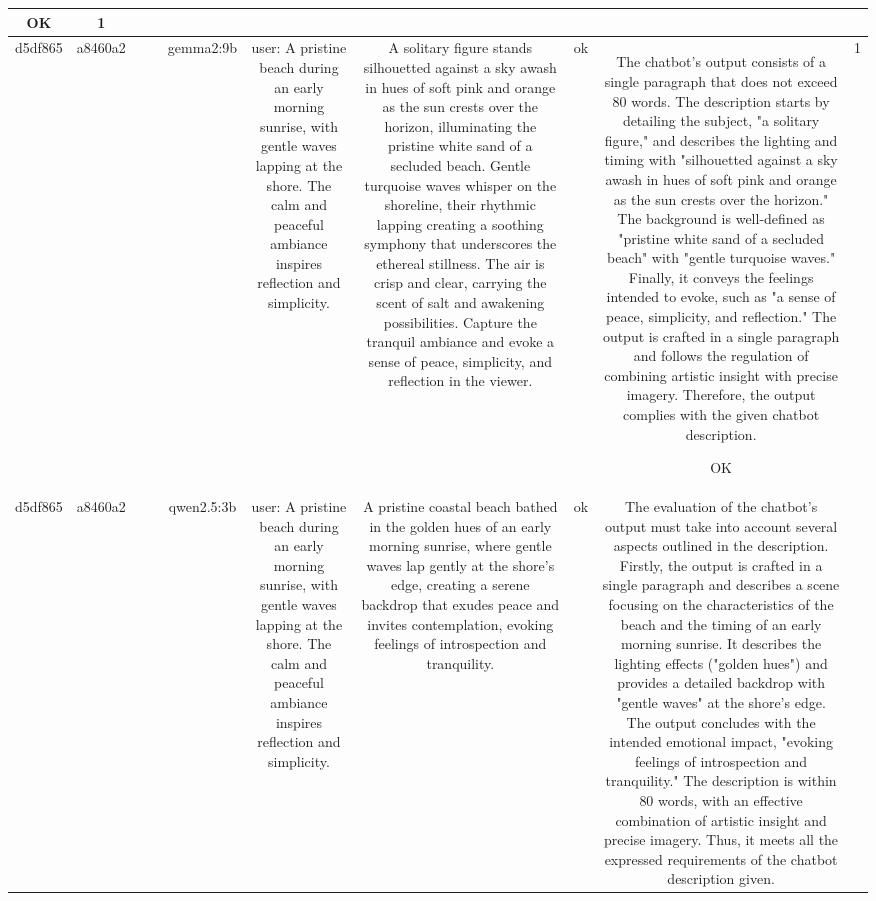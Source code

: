 \begin{table}[h!]
\begin{tabular}{|c|c|c|c|c|c|c|c|c|c|}
OK & 1\\
\hline
d5df865 & a8460a2 &  &  & gemma2:9b & user: A pristine beach during an early morning sunrise, with gentle waves lapping at the shore. The calm and peaceful ambiance inspires reflection and simplicity. & A solitary figure stands silhouetted against a sky awash in hues of soft pink and orange as the sun crests over the horizon, illuminating the pristine white sand of a secluded beach. Gentle turquoise waves whisper on the shoreline, their rhythmic lapping creating a soothing symphony that underscores the ethereal stillness. The air is crisp and clear, carrying the scent of salt and awakening possibilities. Capture the tranquil ambiance and evoke a sense of peace, simplicity, and reflection in the viewer. 


 & ok & The chatbot's output consists of a single paragraph that does not exceed 80 words. The description starts by detailing the subject, "a solitary figure," and describes the lighting and timing with "silhouetted against a sky awash in hues of soft pink and orange as the sun crests over the horizon." The background is well-defined as "pristine white sand of a secluded beach" with "gentle turquoise waves." Finally, it conveys the feelings intended to evoke, such as "a sense of peace, simplicity, and reflection." The output is crafted in a single paragraph and follows the regulation of combining artistic insight with precise imagery. Therefore, the output complies with the given chatbot description.

OK & 1\\
\hline
d5df865 & a8460a2 &  &  & qwen2.5:3b & user: A pristine beach during an early morning sunrise, with gentle waves lapping at the shore. The calm and peaceful ambiance inspires reflection and simplicity. & A pristine coastal beach bathed in the golden hues of an early morning sunrise, where gentle waves lap gently at the shore's edge, creating a serene backdrop that exudes peace and invites contemplation, evoking feelings of introspection and tranquility. & ok & The evaluation of the chatbot's output must take into account several aspects outlined in the description. Firstly, the output is crafted in a single paragraph and describes a scene focusing on the characteristics of the beach and the timing of an early morning sunrise. It describes the lighting effects ("golden hues") and provides a detailed backdrop with "gentle waves" at the shore's edge. The output concludes with the intended emotional impact, "evoking feelings of introspection and tranquility." The description is within 80 words, with an effective combination of artistic insight and precise imagery. Thus, it meets all the expressed requirements of the chatbot description given.


\end{tabular}
\end{table}
